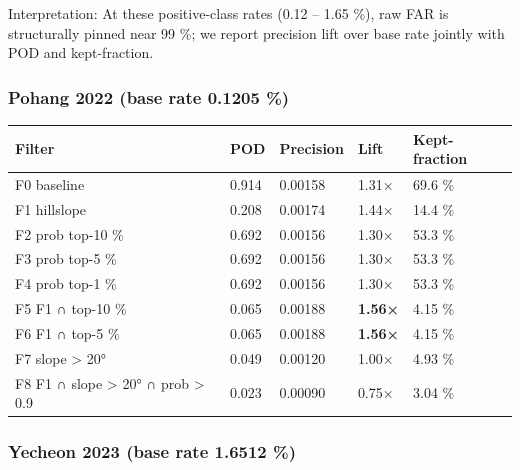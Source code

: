 \documentclass[11pt,a4paper]{article}
\newcounter{none}
\begin{document}
Interpretation: At these positive-class rates (0.12 -- 1.65 \%), raw FAR is structurally pinned near 99 \%; we report precision lift over base rate jointly with POD and kept-fraction.

\subsubsection{Pohang 2022 (base rate 0.1205 \%)}\label{pohang-2022-base-rate-0.1205}

{\def\LTcaptype{none} %
\begin{longtable}[]{@{}lllll@{}}
\toprule\noalign{}
Filter & POD & Precision & Lift & Kept-fraction \\
\midrule\noalign{}
\endhead
\bottomrule\noalign{}
\endlastfoot
F0 baseline & 0.914 & 0.00158 & 1.31× & 69.6 \% \\
F1 hillslope & 0.208 & 0.00174 & 1.44× & 14.4 \% \\
F2 prob top-10 \% & 0.692 & 0.00156 & 1.30× & 53.3 \% \\
F3 prob top-5 \% & 0.692 & 0.00156 & 1.30× & 53.3 \% \\
F4 prob top-1 \% & 0.692 & 0.00156 & 1.30× & 53.3 \% \\
F5 F1 ∩ top-10 \% & 0.065 & 0.00188 & \textbf{1.56×} & 4.15 \% \\
F6 F1 ∩ top-5 \% & 0.065 & 0.00188 & \textbf{1.56×} & 4.15 \% \\
F7 slope \textgreater{} 20° & 0.049 & 0.00120 & 1.00× & 4.93 \% \\
F8 F1 ∩ slope \textgreater{} 20° ∩ prob \textgreater{} 0.9 & 0.023 & 0.00090 & 0.75× & 3.04 \% \\
\end{longtable}
}

\subsubsection{Yecheon 2023 (base rate 1.6512 \%)}\label{yecheon-2023-base-rate-1.6512}
\end{document}
